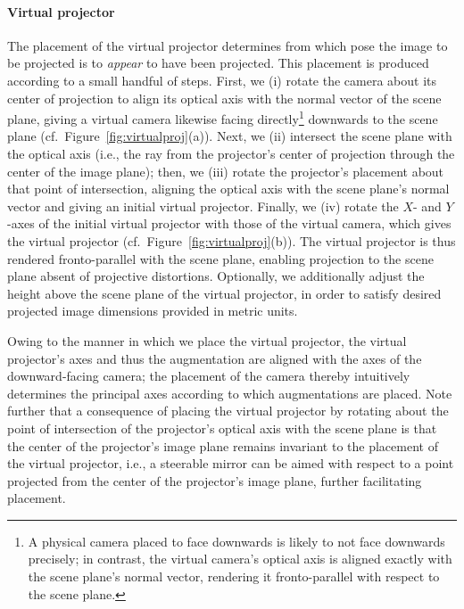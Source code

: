 \documentclass[review]{elsarticle}
\begin{document}
\paragraph{Virtual projector} The placement of the virtual projector determines from which pose the image to be projected is to \textit{appear} to have been projected. This placement is produced according to a small handful of steps. First, we (i) rotate the camera about its center of projection to align its optical axis with the normal vector of the scene plane, giving a virtual camera likewise facing directly\footnote{A physical camera placed to face downwards is likely to not face downwards precisely; in contrast, the virtual camera's optical axis is aligned exactly with the scene plane's normal vector, rendering it fronto-parallel with respect to the scene plane.} downwards to the scene plane (cf.\ Figure~\ref{fig:virtualproj}(a)). Next, we (ii) intersect the scene plane with the optical axis (i.e., the ray from the projector's center of projection through the center of the image plane); then, we (iii) rotate the projector's placement about that point of intersection, aligning the optical axis with the scene plane's normal vector and giving an initial virtual projector. Finally, we (iv) rotate the $X$- and $Y$-axes of the initial virtual projector with those of the virtual camera, which gives the virtual projector (cf.\ Figure~\ref{fig:virtualproj}(b)). The virtual projector is thus rendered fronto-parallel with the scene plane, enabling projection to the scene plane absent of projective distortions. Optionally, we additionally adjust the height above the scene plane of the virtual projector, in order to satisfy desired projected image dimensions provided in metric units.

Owing to the manner in which we place the virtual projector, the virtual projector's axes and thus the augmentation are aligned with the axes of the downward-facing camera; the placement of the camera thereby intuitively determines the principal axes according to which augmentations are placed. Note further that a consequence of placing the virtual projector by rotating about the point of intersection of the projector's optical axis with the scene plane is that the center of the projector's image plane remains invariant to the placement of the virtual projector, i.e., a steerable mirror can be aimed with respect to a point projected from the center of the projector's image plane, further facilitating placement.
\end{document}
